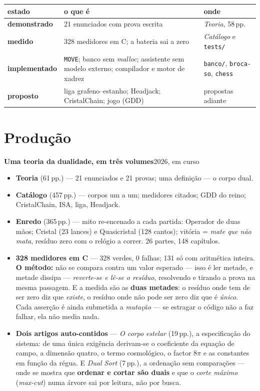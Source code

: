 \documentclass[11pt,a4paper]{article}
\newcommand{\lin}[2]{\noindent\textbf{#1}\hfill{\color{cinza}\small #2}\par}
\begin{document}
\begin{center}\footnotesize
\begin{tabular}{@{}p{2.5cm}p{7.6cm}p{4.4cm}@{}}
\toprule
\textbf{estado} & \textbf{o que é} & \textbf{onde} \\
\midrule
\textbf{demonstrado} &
21 enunciados com prova escrita &
\emph{Teoria}, 58\,pp. \\[2pt]
\textbf{medido} &
328 medidores em C; a bateria sai a zero &
\emph{Catálogo} e \texttt{tests/} \\[2pt]
\textbf{implementado} &
\texttt{MOVE}; banco sem \emph{malloc}; assistente sem modelo
externo; compilador e motor de xadrez &
\texttt{banco/}, \texttt{broca-so}, \texttt{chess} \\[2pt]
\textbf{proposto} &
liga grafeno--estanho; Headjack; CristalChain; jogo (GDD) &
propostas adiante \\
\bottomrule
\end{tabular}
\end{center}

\section*{Produção}

\lin{Uma teoria da dualidade, em três volumes}{2026, em curso}
\begin{itemize}
\item \textbf{Teoria} (61\,pp.) --- 21 enunciados e 21 provas; uma definição --- o corpo dual.
\item \textbf{Catálogo} (457\,pp.) --- corpos um a um; medidores citados; GDD do reino;
CristalChain, ISA, liga, Headjack.
\item \textbf{Enredo} (365\,pp.) --- mito re-encenado a cada partida: Operador de duas mãos;
Cristal (23 lances) e Quasicristal (128 cantos); vitória = \emph{mate que não mata},
resíduo zero com o relógio a correr. 26 partes, 148 capítulos.
\item \textbf{328 medidores em C} --- 328 verdes, 0 falhas; 131 só com aritmética inteira.
\textbf{O método:} não se compara contra um valor esperado --- isso é ler metade, e metade dissipa
--- \emph{reverte-se e lê-se o resíduo}, resolvendo e tirando a prova na mesma passagem. E a medida
são as \textbf{duas metades}: o resíduo onde tem de ser zero diz que \emph{existe}, o resíduo onde
não pode ser zero diz que é \emph{único}. Cada asserção é ainda submetida a \emph{mutação} --- se
estragar o código não a faz falhar, ela não media nada.
\item \textbf{Dois artigos auto-contidos} --- \emph{O corpo estelar} (19\,pp.), a especificação do
sistema: de uma única exigência derivam-se o coeficiente da equação de campo, a dimensão quatro, o
termo cosmológico, o factor $8\pi$ e as constantes em função da régua. E \emph{Dual Sort} (7\,pp.),
a ordenação sem comparações --- onde se mostra que \textbf{ordenar e cortar são duais} e que o
\emph{corte máximo} (\emph{max-cut}) numa árvore sai por leitura, não por busca.
\end{itemize}
\end{document}
